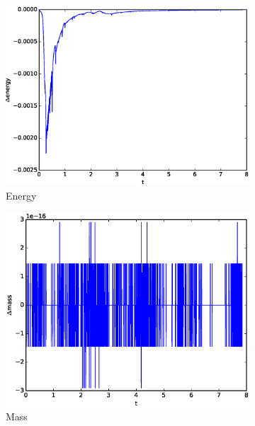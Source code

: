 \begin{figure}[htp]
    \centering
    \begin{subfigure}[b]{0.312\textwidth}
        \centering
        \includegraphics[width=\textwidth]{images/E1d.eps}\hfill
        \caption{Energy}
        \label{fig:Energy}
    \end{subfigure}
    \hfill
    \begin{subfigure}[b]{0.32\textwidth}
        \centering
        \includegraphics[width=\textwidth]{images/Ma1d.eps}\hfill
        \caption{Mass}
        \label{fig:Mass}
    \end{subfigure}
    \hfill
    \begin{subfigure}[b]{0.32\textwidth}

\end{subfigure}
\end{figure}

